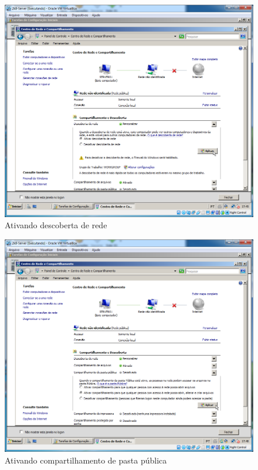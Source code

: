 \documentclass[10pt]{article}
\begin{document}
\begin{figure}[H]
    \centering
    \caption{Ativando descoberta de rede}
    \label{fig:4233}
    \includegraphics[width=\linewidth]{images/configuracao_windows/windows_server/024.png}
\end{figure}
\begin{figure}[H]
    \centering
    \caption{Ativando compartilhamento de pasta pública}
    \label{fig:4234}
    \includegraphics[width=\linewidth]{images/configuracao_windows/windows_server/028.png}
\end{figure}
\end{document}
